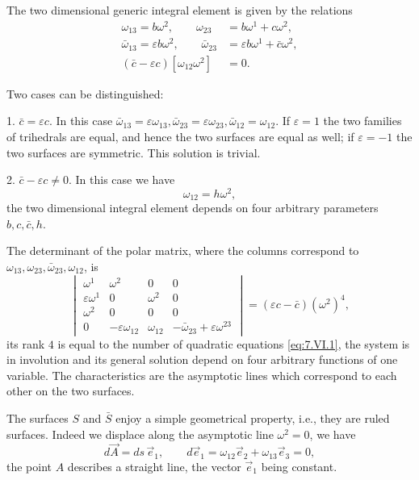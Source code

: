 \documentclass[leqno,11pt]{book}
\numberwithin{equation}{chapter}
\theoremstyle{shape1}
\theoremstyle{shape0}
\theoremstyle{shape2}
\theoremstyle{definition}
\begin{document}
The two dimensional generic integral element is given by the relations
\begin{align*}
  \omega_{13}=b\omega^{2},\qquad\omega_{23}&=b\omega^{1}+c\omega^{2},\\
  \bar\omega_{13}=\varepsilon b\omega^{2},\qquad\bar\omega_{23}&=\varepsilon b\omega^{1}+\bar c\omega^{2},\\
  (\bar c-\varepsilon c)[\omega_{12}\omega^{2}]&=0.
\end{align*}

Two cases can be distinguished:

1. $\bar c=\varepsilon c$. In this case $\bar \omega_{13}=\varepsilon\omega_{13},\bar\omega_{23}=\varepsilon\omega_{23},\bar\omega_{12}=\omega_{12}$. If $\varepsilon=1$ the two families of trihedrals are equal, and hence the two surfaces are equal as well; if $\varepsilon=-1$ the two surfaces are symmetric. This solution is trivial.

2. $\bar c-\varepsilon c\neq 0$. In this case we have
\[
\omega_{12}=h\omega^{2},
\]
the two dimensional integral element depends on four arbitrary parameters $b,c,\bar c, h$.

The determinant of the polar matrix, where the  columns  correspond to $\omega_{13},\omega_{23},\bar\omega_{23},\omega_{12}$, is
\[
\begin{vmatrix}
  \omega^{1}&\omega^{2}&0&0\\
  \varepsilon\omega^{1}&0&\omega^{2}&0\\
  \omega^{2}&0&0&0\\
  0&-\varepsilon\omega_{12}&\omega_{12}&-\bar\omega_{23}+\varepsilon\omega^{23}
\end{vmatrix}=(\varepsilon c-\bar c)(\omega^{2})^{4},
\]
its rank $4$ is equal to the number of quadratic equations \eqref{eq:7.VI.1}, the system is in involution and its general solution depend on four arbitrary functions of one variable. The characteristics are the asymptotic lines which correspond to each other on the two surfaces.

The surfaces $S$ and $\bar S$ enjoy a simple geometrical property, i.e., they are ruled surfaces. Indeed we displace along the asymptotic line $\omega^{2}=0$, we have
\[
d\vec A=ds\,\vec e_{1},\qquad d\vec e_{1}=\omega_{12}\vec e_{2}+\omega_{13}\vec e_{3}=0,
\]
the point $A$ describes a straight line, the vector $\vec e_{1}$ being constant.
\end{document}
